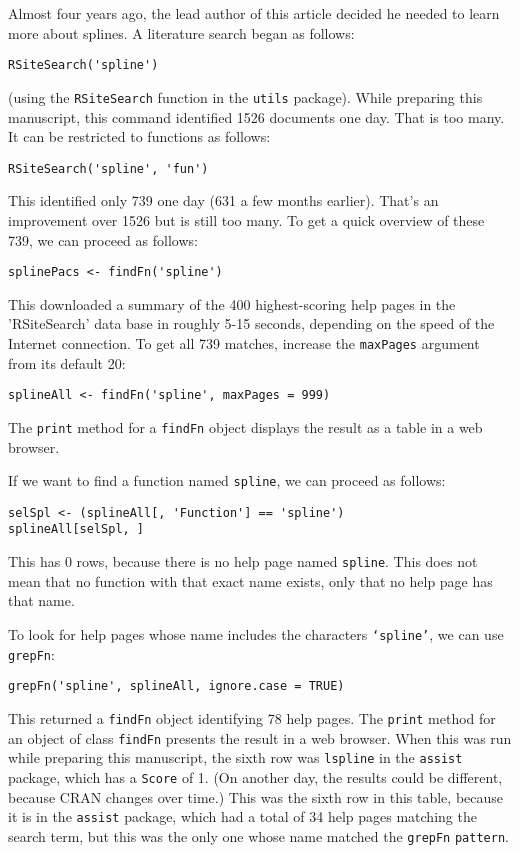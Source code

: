 Almost four years ago, the lead author of this article decided he
needed to learn more about splines.  A literature search
began as follows:
\begin{verbatim}
RSiteSearch('spline')
\end{verbatim}
(using the {\tt RSiteSearch} function in the {\tt utils} package).
While preparing this manuscript, this command identified
1526 documents one day.  That is too many.  It can be
restricted to functions as follows:
\begin{verbatim}
RSiteSearch('spline', 'fun')
\end{verbatim}
This identified only 739 one day (631 a few months earlier).
That's an improvement over 1526 but is still too many.
To get a quick overview of these 739, we can proceed
as follows:
\begin{verbatim}
splinePacs <- findFn('spline')
\end{verbatim}
This downloaded a summary of the 400 highest-scoring help pages
in the 'RSiteSearch' data base in roughly 5-15 seconds, depending
on the speed of the Internet connection.  To get all 739 matches,
increase the {\tt maxPages} argument from its default 20:
\begin{verbatim}
splineAll <- findFn('spline', maxPages = 999)
\end{verbatim}
The {\tt print} method for a {\tt findFn} object displays the
result as a table in a web browser.

If we want to find a function named {\tt spline}, we can
proceed as follows:
\begin{verbatim}
selSpl <- (splineAll[, 'Function'] == 'spline')
splineAll[selSpl, ]
\end{verbatim}
This has 0 rows, because there is no help page named
{\tt spline}.  This does not mean that no function
with that exact name exists, only that no help page
has that name.

To look for help pages whose name includes the characters
{\tt `spline'}, we can use {\tt grepFn}:
\begin{verbatim}
grepFn('spline', splineAll, ignore.case = TRUE)
\end{verbatim}
This returned a {\tt findFn} object identifying 78 help pages.
The {\tt print} method for an object of class {\tt findFn}
presents the result in a web browser.  When this was
run while preparing this manuscript, the sixth row was
{\tt lspline} in the
{\tt assist} package, which has a {\tt Score} of 1.
(On another day, the results could be different, because
CRAN changes over time.)  This was the sixth row in this
table, because it is in the
{\tt assist} package, which had a total of 34 help
pages matching the search term, but this was the only
one whose name matched the {\tt grepFn} {\tt pattern}.

